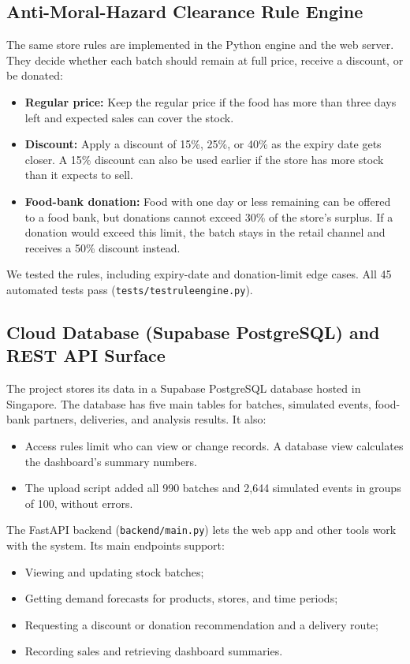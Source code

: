 \documentclass[12pt,a4paper]{article}
\renewcommand{\_}{\oldunderscore\allowbreak}
\begin{document}
\subsection{Anti-Moral-Hazard Clearance Rule Engine}
The same store rules are implemented in the Python engine and the web server. They decide whether each batch should remain at full price, receive a discount, or be donated:
\begin{itemize}[leftmargin=18pt, itemsep=2pt]
    \item \textbf{Regular price:} Keep the regular price if the food has more than three days left and expected sales can cover the stock.
    \item \textbf{Discount:} Apply a discount of 15\%, 25\%, or 40\% as the expiry date gets closer. A 15\% discount can also be used earlier if the store has more stock than it expects to sell.
    \item \textbf{Food-bank donation:} Food with one day or less remaining can be offered to a food bank, but donations cannot exceed 30\% of the store's surplus. If a donation would exceed this limit, the batch stays in the retail channel and receives a 50\% discount instead.
\end{itemize}
We tested the rules, including expiry-date and donation-limit edge cases. All 45 automated tests pass (\texttt{tests/test\_rule\_engine.py}).

\subsection{Cloud Database (Supabase PostgreSQL) and REST API Surface}
The project stores its data in a Supabase PostgreSQL database hosted in Singapore. The database has five main tables for batches, simulated events, food-bank partners, deliveries, and analysis results. It also:
\begin{itemize}[leftmargin=18pt, itemsep=2pt]
    \item Access rules limit who can view or change records. A database view calculates the dashboard's summary numbers.
    \item The upload script added all 990 batches and 2,644 simulated events in groups of 100, without errors.
\end{itemize}

The FastAPI backend (\texttt{backend/main.py}) lets the web app and other tools work with the system. Its main endpoints support:
\begin{itemize}[leftmargin=18pt, itemsep=1pt]
    \item Viewing and updating stock batches;
    \item Getting demand forecasts for products, stores, and time periods;
    \item Requesting a discount or donation recommendation and a delivery route;
    \item Recording sales and retrieving dashboard summaries.
\end{itemize}
\end{document}
